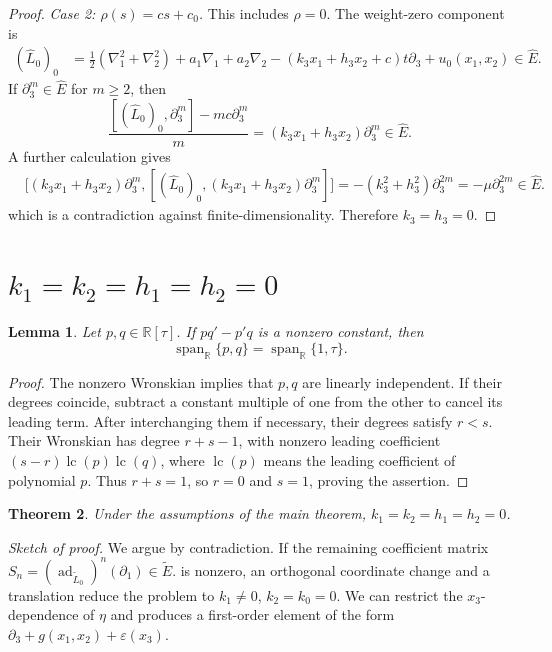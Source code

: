 \documentclass{tCON2e}
\newenvironment{revision}{\begingroup\color{black}}{\endgroup}
\numberwithin{equation}{section}
\theoremstyle{journalplain}
\newtheorem{theorem}{Theorem}[section]
\newtheorem{lemma}[theorem]{Lemma}
\theoremstyle{journaldef}
\newenvironment{revision}{}{}
\begin{document}
\begin{revision}
\begin{proof}
\emph{Case 2: $\rho(s)=cs+c_0$.}
This includes $\rho=0$. The weight-zero component is
\[
\begin{aligned}
(\widehat L_0)_0
&=\frac12(\nabla_1^2+\nabla_2^2)
+a_1\nabla_1+a_2\nabla_2
-(k_3x_1+h_3x_2+c)t\partial_3+u_0(x_1,x_2)
\in\widehat E.
\end{aligned}
\]
If $\partial_3^m\in\widehat E$ for $m\ge2$, then
\[
\frac{[(\widehat L_0)_0,\partial_3^m]-mc\partial_3^m}{m}
=(k_3x_1+h_3x_2)\partial_3^m\in\widehat E.
\]
A further calculation gives
\[
\begin{aligned}
&\bigl[(k_3x_1+h_3x_2)\partial_3^m,
[(\widehat L_0)_0,(k_3x_1+h_3x_2)\partial_3^m]\bigr]
=-(k_3^2+h_3^2)\partial_3^{2m}
=-\mu\partial_3^{2m} \in \widehat E.
\end{aligned}
\]
which is a contradiction against finite-dimensionality.
Therefore $k_3=h_3=0$.
\end{proof}

\section{$k_1=k_2=h_1 = h_2=0$}\label{sec:mixed}


\begin{lemma}\label{lem:constant-wronskian}
Let $p,q\in\mathbb R[\tau]$. If $pq'-p'q$ is a nonzero
constant, then
\[
\operatorname{span}_{\mathbb R}\{p,q\}
=\operatorname{span}_{\mathbb R}\{1,\tau\}.
\]
\end{lemma}

\begin{proof}
The nonzero Wronskian implies that $p,q$ are linearly
independent. If their degrees coincide, subtract a constant
multiple of one from the other to cancel its leading term.
After interchanging them if necessary, their degrees satisfy
$r<s$. Their Wronskian has degree $r+s-1$, with nonzero
leading coefficient
$(s-r)\operatorname{lc}(p)\operatorname{lc}(q)$, where $\operatorname{lc}(p)$ means the leading coefficient of polynomial $p$.
Thus $r+s=1$, so $r=0$ and $s=1$, proving the assertion.
\end{proof}

\begin{theorem}\label{thm:remaining-visible}
Under the assumptions of the main theorem, $k_1=k_2=h_1=h_2=0$.
\end{theorem}

\noindent\emph{Sketch of proof.}
We argue by contradiction. If the remaining coefficient matrix \(
S_n=(\operatorname{ad}_{\widetilde L_0})^n(\partial_1)
\in\widetilde E.
\)
is nonzero, an orthogonal coordinate change and a translation
reduce the problem to $k_1\ne0$, $k_2=k_0=0$.
We can restrict the $x_3$-dependence of $\eta$ and produces a
first-order element of the form
$\partial_3+g(x_1,x_2)+\varepsilon(x_3)$.


\end{revision}
\end{document}
